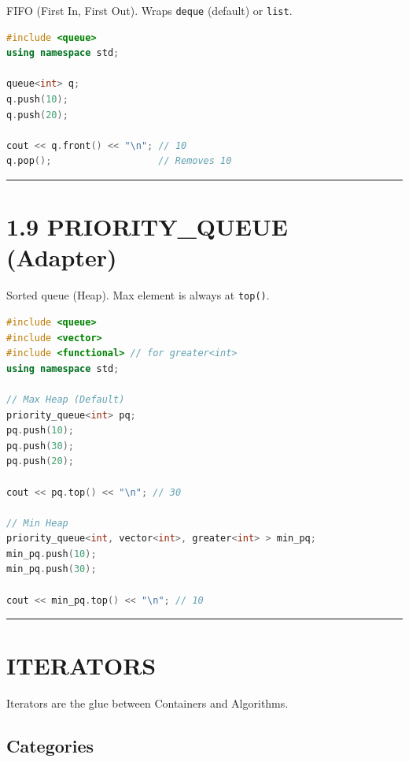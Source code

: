 FIFO (First In, First Out). Wraps \passthrough{\lstinline!deque!}
(default) or \passthrough{\lstinline!list!}.

\begin{lstlisting}[language={C++}]
#include <queue>
using namespace std;

queue<int> q;
q.push(10);
q.push(20);

cout << q.front() << "\n"; // 10
q.pop();                   // Removes 10
\end{lstlisting}

\begin{center}\rule{0.5\linewidth}{0.5pt}\end{center}

\hypertarget{priority_queue-adapter}{%
\section{1.9 PRIORITY\_QUEUE (Adapter)}\label{priority_queue-adapter}}

Sorted queue (Heap). Max element is always at
\passthrough{\lstinline!top()!}.

\begin{lstlisting}[language={C++}]
#include <queue>
#include <vector>
#include <functional> // for greater<int>
using namespace std;

// Max Heap (Default)
priority_queue<int> pq;
pq.push(10);
pq.push(30);
pq.push(20);

cout << pq.top() << "\n"; // 30

// Min Heap
priority_queue<int, vector<int>, greater<int> > min_pq;
min_pq.push(10);
min_pq.push(30);

cout << min_pq.top() << "\n"; // 10
\end{lstlisting}

\begin{center}\rule{0.5\linewidth}{0.5pt}\end{center}

\hypertarget{iterators}{%
\section{ITERATORS}\label{iterators}}

Iterators are the glue between Containers and Algorithms.

\hypertarget{categories}{%
\subsection{Categories}\label{categories}}

